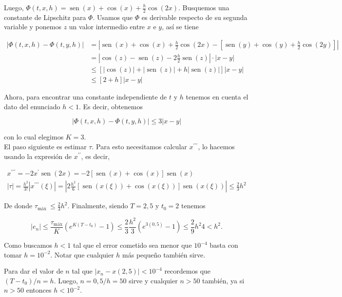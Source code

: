 \documentclass[10pt]{article}
\begin{document}
Luego, $\Phi(t, x, h)=\operatorname{sen}(x)+\cos (x)+\frac{h}{2} \cos (2 x)$. Busquemos una constante de Lipschitz para $\Phi$. Usamos que $\Phi$ es derivable respecto de su segunda variable y ponemos $z$ un valor intermedio entre $x$ e $y$, así se tiene

$$
\begin{aligned}
|\Phi(t, x, h)-\Phi(t, y, h)| & =\left|\operatorname{sen}(x)+\cos (x)+\frac{h}{2} \cos (2 x)-\left[\operatorname{sen}(y)+\cos (y)+\frac{h}{2} \cos (2 y)\right]\right| \\
& =\left|\cos (z)-\operatorname{sen}(z)-2 \frac{h}{2} \operatorname{sen}(z)\right| \cdot|x-y| \\
& \leq[|\cos (z)|+|\operatorname{sen}(z)|+h|\operatorname{sen}(z)|]|x-y| \\
& \leq[2+h]|x-y|
\end{aligned}
$$

Ahora, para encontrar una constante independiente de $t$ y $h$ tenemos en cuenta el dato del enunciado $h<1$. Es decir, obtenemos

$$
|\Phi(t, x, h)-\Phi(t, y, h)| \leq 3|x-y|
$$

con lo cual elegimos $K=3$.\\
El paso siguiente es estimar $\tau$. Para esto necesitamos calcular $x^{\prime \prime \prime}$, lo hacemos usando la expresión de $x^{\prime \prime}$, es decir,

$$
\begin{gathered}
x^{\prime \prime \prime}=-2 x^{\prime} \operatorname{sen}(2 x)=-2[\operatorname{sen}(x)+\cos (x)] \operatorname{sen}(x) \\
|\tau|=\frac{h^{2}}{3!}\left|x^{\prime \prime \prime}(\xi)\right|=\left|2 \frac{h^{2}}{6}[\operatorname{sen}(x(\xi))+\cos (x(\xi))] \operatorname{sen}(x(\xi))\right| \leq \frac{2}{3} h^{2}
\end{gathered}
$$

De donde $\tau_{\text {máx }} \leq \frac{2}{3} h^{2}$. Finalmente, siendo $T=2,5$ y $t_{0}=2$ tenemos

$$
\left|e_{n}\right| \leq \frac{\tau_{\operatorname{máx}}}{K}\left(e^{K\left(T-t_{0}\right)}-1\right) \leq \frac{2}{3} \frac{h^{2}}{3}\left(e^{3(0,5)}-1\right) \leq \frac{2}{9} h^{2} 4<h^{2} .
$$

Como buscamos $h<1$ tal que el error cometido sea menor que $10^{-4}$ basta con tomar $h=10^{-2}$. Notar que cualquier $h$ más pequeño también sirve.

Para dar el valor de $n$ tal que $\left|x_{n}-x(2,5)\right|<10^{-4}$ recordemos que $\left(T-t_{0}\right) / n=h$. Luego, $n=0,5 / h=50$ sirve y cualquier $n>50$ también, ya si $n>50$ entonces $h<10^{-2}$.
\end{document}
